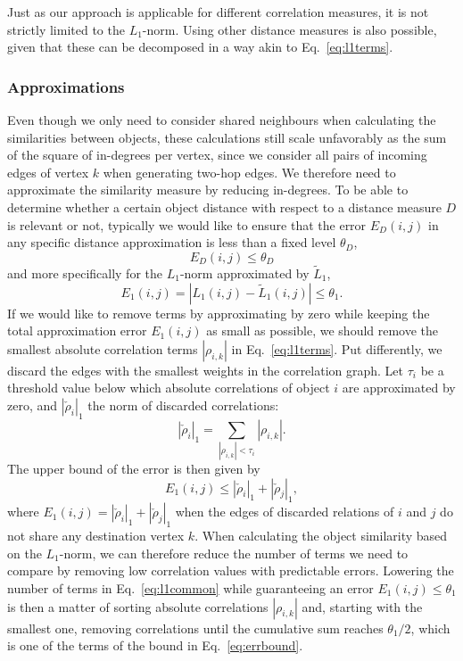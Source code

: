 \documentclass{kais}
\newcommand{\rn}[1]{\rho_{#1}}
\newcommand{\mrn}[1]{\tau_{#1}}
\newcommand{\drns}[1]{|\check{\rho}_{#1}|_1}
\newcommand{\nm}[1]{L_1(#1)}
\newcommand{\anm}[1]{\tilde{L}_1(#1)}
\begin{document}
Just as our approach is applicable for different correlation measures, it is not strictly limited to the $L_1$-norm. Using 
other distance measures is also possible, given that these can be decomposed in a way akin to Eq.~\ref{eq:l1terms}. 

\subsubsection{Approximations}
\label{sec:approximations}
Even though we only need to consider shared neighbours when calculating the similarities between objects, these
calculations still scale unfavorably as the sum of the square of in-degrees per vertex, since we consider all pairs of
incoming edges of vertex $k$ when generating two-hop edges. We therefore need to approximate the similarity measure by
reducing in-degrees. To be able to determine whether a certain object distance with respect to a distance measure $D$ is
relevant or not, typically we would like to ensure that the error $E_{D}(i,j)$ in any specific distance approximation
is less than a fixed level $\theta_D$,
\begin{equation}
E_{D}(i,j) \leq \theta_D
\end{equation}
and more specifically for the $L_1$-norm approximated by $\tilde{L}_1$,
\begin{equation}
E_1(i,j) = | \nm{i,j}  - \anm{i,j}  | \leq \theta_1.
\end{equation}
If we would like to remove terms by approximating by zero while keeping the total approximation error $E_1(i,j)$ 
as small as possible, we should remove the smallest absolute correlation terms $|\rn{i,k}|$ in Eq.\ \ref{eq:l1terms}. Put differently,
we discard the edges with the smallest weights in the correlation graph.
Let $\mrn{i}$ be a threshold value below which absolute correlations of object $i$ are approximated by zero, and $\drns{i}$ the 
norm of discarded correlations:
\begin{equation} \label{}
\drns{i} = \sum_{ |\rn{i,k}| < \mrn{i}} |\rn{i,k}|.
\end{equation}
The upper bound of the error is then given by
\begin{equation} \label{eq:errbound}
E_1(i,j) \leq \drns{i} + \drns{j},
\end{equation}
where $E_1(i,j)=\drns{i} + \drns{j}$ when the edges of discarded relations of $i$ and $j$ do not share any destination
vertex $k$. When calculating the object similarity based on the $L_1$-norm, we can therefore reduce the number of
terms we need to compare by removing low correlation values with predictable errors. Lowering the number of terms in
Eq.\ \ref{eq:l1common} while guaranteeing an error $E_1(i,j) \leq \theta_1$ is then a matter of sorting absolute correlations
$|\rn{i,k}|$ and, starting with the smallest one, removing correlations until the cumulative sum reaches $\theta_1/2$, 
which is one of the terms of the bound in Eq.~\ref{eq:errbound}.
\end{document}
